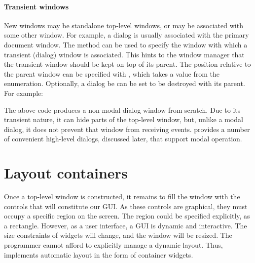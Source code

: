 \paragraph{Transient windows}
New windows may be standalone top-level windows, or may be associated
with some other window. For example, a dialog is usually associated
with the primary document window. The
 method can be used to specify the
window with which a transient (dialog) window is associated. This
hints to the window manager that the transient window should be kept on
top of its parent. The position relative to the parent window can be
specified with , which takes a value from the
 enumeration. Optionally, a dialog be can be
set to be destroyed with its parent. For example:
\begin{Schunk}
\end{Schunk}
% 
The above code produces a non-modal dialog window from scratch. Due to
its transient nature, it can hide parts of the top-level window, but,
unlike a modal dialog, it does not prevent that window from receiving
events. \GTK\/ provides a number of convenient high-level dialogs,
discussed later, that support modal operation.



\section{Layout containers}
\label{sec:RGtk2:layout}

Once a top-level window is constructed, it remains to fill the window
with the controls that will constitute our GUI. As these controls are
graphical, they must occupy a specific region on the screen. The
region could be specified explicitly, as a rectangle. However, as a
user interface, a GUI is dynamic and interactive. The size constraints
of widgets will change, and the window will be resized. The programmer
cannot afford to explicitly manage a dynamic layout. Thus, \GTK\/
implements automatic layout in the form of container widgets.

